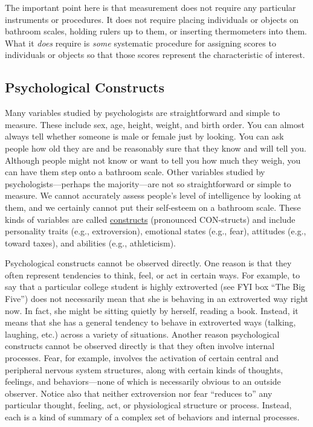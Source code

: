 \documentclass[
]{krantz}
\begin{document}
The important point here is that measurement does not require any particular instruments or procedures. It does not require placing individuals or objects on bathroom scales, holding rulers up to them, or inserting thermometers into them. What it \emph{does} require is \emph{some} systematic procedure for assigning scores to individuals or objects so that those scores represent the characteristic of interest.

\subsection*{Psychological Constructs}\label{psychological-constructs}


Many variables studied by psychologists are straightforward and simple to measure. These include sex, age, height, weight, and birth order. You can almost always tell whether someone is male or female just by looking. You can ask people how old they are and be reasonably sure that they know and will tell you. Although people might not know or want to tell you how much they weigh, you can have them step onto a bathroom scale. Other variables studied by psychologists---perhaps the majority---are not so straightforward or simple to measure. We cannot accurately assess people's level of intelligence by looking at them, and we certainly cannot put their self-esteem on a bathroom scale. These kinds of variables are called \hyperref[construct]{constructs} (pronounced CON-structs) and include personality traits (e.g., extroversion), emotional states (e.g., fear), attitudes (e.g., toward taxes), and abilities (e.g., athleticism).

Psychological constructs cannot be observed directly. One reason is that they often represent tendencies to think, feel, or act in certain ways. For example, to say that a particular college student is highly extroverted (see FYI box ``The Big Five'') does not necessarily mean that she is behaving in an extroverted way right now. In fact, she might be sitting quietly by herself, reading a book. Instead, it means that she has a general tendency to behave in extroverted ways (talking, laughing, etc.) across a variety of situations. Another reason psychological constructs cannot be observed directly is that they often involve internal processes. Fear, for example, involves the activation of certain central and peripheral nervous system structures, along with certain kinds of thoughts, feelings, and behaviors---none of which is necessarily obvious to an outside observer. Notice also that neither extroversion nor fear ``reduces to'' any particular thought, feeling, act, or physiological structure or process. Instead, each is a kind of summary of a complex set of behaviors and internal processes.
\end{document}
